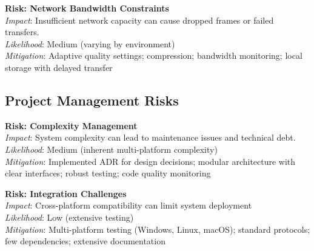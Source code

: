 \textbf{Risk: Network Bandwidth Constraints}\\
\emph{Impact}: Insufficient network capacity can cause dropped frames or failed transfers.\\
\emph{Likelihood}: Medium (varying by environment)\\
\emph{Mitigation}: Adaptive quality settings; compression; bandwidth monitoring; local storage with delayed transfer

\subsection{Project Management Risks}
\textbf{Risk: Complexity Management}\\
\emph{Impact}: System complexity can lead to maintenance issues and technical debt.\\
\emph{Likelihood}: Medium (inherent multi-platform complexity)\\
\emph{Mitigation}: Implemented ADR for design decisions; modular architecture with clear interfaces; robust testing; code quality monitoring

\textbf{Risk: Integration Challenges}\\
\emph{Impact}: Cross-platform compatibility can limit system deployment\\
\emph{Likelihood}: Low (extensive testing)\\
\emph{Mitigation}: Multi-platform testing (Windows, Linux, macOS); standard protocols; few dependencies; extensive documentation
